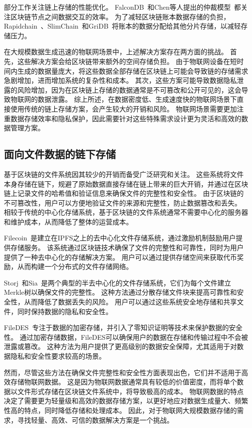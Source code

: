 部分工作关注链上存储的性能优化。
FalconDB~\cite{peng2020falcondb}和Chen等人提出的仲裁模型~\cite{chen2022blockchain}都关注区块链节点之间数据交互的效率。
为了减轻区块链账本数据存储的负担，Rapidchain~\cite{zamani2018rapidchain}、SlimChain~\cite{xu2021slimchain}和GriDB~\cite{hong2023gridb}将账本的数据分配给其他分片存储，以减轻存储压力。

在大规模数据生成迅速的物联网场景中，上述解决方案存在两方面的挑战。
首先，这些解决方案会给区块链带来额外的空间存储负担。
由于物联网设备在短时间内生成的数据量庞大，将这些数据全部存储在区块链上可能会导致链的存储需求急剧增加，进而增加系统的复杂性和成本。
其次，这些方案可能导致数据隐私泄露的风险增加，因为在区块链上存储的数据通常是不可篡改和公开可见的，这会导致物联网的数据泄露。
综上所述，在数据密度低、生成速度快的物联网场景下直接使用传统的链上存储方案，会产生较大的开销和风险。
物联网场景需要更加注重数据存储效率和隐私保护，因此需要针对这些特殊需求设计更为灵活和高效的数据管理方案。

\subsection{面向文件数据的链下存储}
基于区块链的文件系统因其较少的开销而备受广泛研究和关注。
这些系统将文件本身存储在链下，规避了原始数据直接存储在链上带来的巨大开销，并通过在区块链上记录文件的哈希值和验证信息来确保文件的完整性和安全性。
由于区块链的不可篡改性，用户可以方便地验证文件的来源和完整性，防止数据篡改和丢失。
相较于传统的中心化存储系统，基于区块链的文件系统通常不需要中心化的服务器和维护成本，从而降低了整体的运营成本。

Filecoin~\cite{bauer2022filecoin}是建立在IPFS之上的去中心化文件存储系统，通过激励机制鼓励用户提供存储服务。
该系统通过区块链技术确保了文件的完整性和可靠性，同时为用户提供了一种去中心化的存储解决方案。
用户可以通过提供存储空间来获取代币奖励，从而构建一个分布式的文件存储网络。

Storj~\cite{storj2018storj}和Sia~\cite{vorick2014sia}是两个典型的半去中心化的文件存储系统，它们为每个文件建立Merkle树以确保文件的完整性。
这种方法通过分散存储文件块来提高可靠性和安全性，从而降低了数据丢失的风险。
用户可以通过这些系统安全地存储和共享文件，同时保持数据的隐私和安全性。

FileDES~\cite{xu2024filedes}专注于数据的加密存储，并引入了零知识证明等技术来保护数据的安全性。
通过加密存储数据，FileDES可以确保用户的数据在存储和传输过程中不会被泄露或篡改。
这种方法为用户提供了更高级别的数据安全保障，尤其适用于对数据隐私和安全性要求较高的场景。

然而，尽管这些方法在确保文件完整性和安全性方面表现出色，它们并不适用于高效存储物联网数据。
这是因为物联网数据通常具有较低的价值密度，而将单个数据以文件形式存储在区块链文件系统中，将导致极高的成本。
物联网数据的特点决定了需要更为轻量级和高效的数据存储方案，以更好地应对数据生成量大、频繁性高的特点，同时降低存储和处理成本。
因此，对于物联网大规模数据存储的需求，寻找轻量、高效、可信的数据解决方案是一个挑战。

